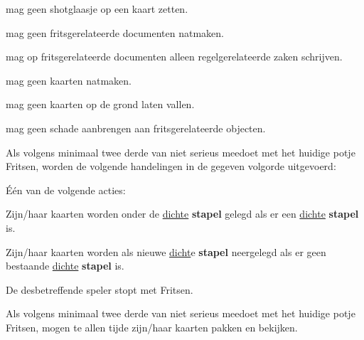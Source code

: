 \vervolgLijst{}
    \item \EenSpeler mag geen shotglaasje op een kaart zetten.
\eindLijst{} 

\vervolgLijst{}
    \item \EenSpeler mag geen fritsgerelateerde documenten natmaken.
\eindLijst{} 

\vervolgLijst{}
    \item \EenSpeler mag op fritsgerelateerde documenten alleen regelgerelateerde zaken schrijven.
\eindLijst{}

\vervolgLijst{}
    \item \EenSpeler mag geen kaarten natmaken.
\eindLijst{}  

\vervolgLijst{}
    \item \EenSpeler mag geen kaarten op de grond laten vallen.
\eindLijst{}  

\vervolgLijst{}
    \item \EenSpeler mag geen schade aanbrengen aan fritsgerelateerde objecten. 
\eindLijst{}



\vervolgLijst{}
    \item Als \eenSpeler volgens minimaal twee derde van \alleSpelers niet serieus meedoet met het huidige potje Fritsen, worden de volgende handelingen in de gegeven volgorde uitgevoerd:
    \numeriekeLijst{}
        \item Één van de volgende acties:
        \puntLijst{}
            \item Zijn/haar kaarten worden onder de \ul{dichte} \textbf{stapel} gelegd als er een \ul{dichte} \textbf{stapel} is. 
            \item Zijn/haar kaarten worden als nieuwe \ul{dicht}e \textbf{stapel} neergelegd als er geen bestaande \ul{dichte} \textbf{stapel} is. 
        \eindPuntLijst{}
        \item De desbetreffende speler stopt met Fritsen.
    \eindNumeriekeLijst{}
\eindLijst{}

\vervolgLijst{}
    \item Als \eenSpeler volgens minimaal twee derde van \alleSpelers niet serieus meedoet met het huidige potje Fritsen, mogen \alleSpelers te allen tijde zijn/haar kaarten pakken en bekijken.
\eindLijst{}



